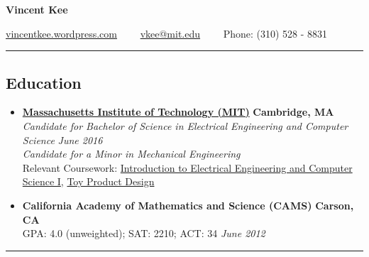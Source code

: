\documentclass[10pt,letterpaper]{article}
\begin{document}
\begin{center}
{\huge \textbf{Vincent Kee}}


\href{http://vincentkee.wordpress.com}{vincentkee.wordpress.com}\ \ \textbullet
\ \ \href{mailto:vkee@mit.edu}{vkee@mit.edu}\ \ \textbullet
\ \  Phone: (310) 528 - 8831
\end{center}

\hrule
\vspace{-0.4em}

\subsection*{Education}
  \begin{itemize}
    \parskip=-0.1em

    \item[]
    {\href{http://mit.edu/}{\textbf{Massachusetts Institute of Technology (MIT)}} \hfill
      \textbf{Cambridge, MA}}
    \\
    {\emph{Candidate for Bachelor of Science in Electrical Engineering and Computer Science} \hfill
      \emph{June 2016}}\\
      \emph{Candidate for a Minor in Mechanical Engineering}
      \\
      Relevant Coursework: \href{http://student.mit.edu/catalog/search.cgi?search=6.01&style=verbatim
}{Introduction to Electrical Engineering and Computer Science I}, \href{http://student.mit.edu/catalog/search.cgi?search=2.00b&style=verbatim}{Toy Product Design} 

    \item[]
    {{\textbf{California Academy of Mathematics and Science (CAMS)}} \hfill
      \textbf{Carson, CA}}
    \\
    {GPA: 4.0 (unweighted); SAT: 2210; ACT: 34 \hfill
      \emph{June 2012}}
  \end{itemize}

\hrule
\vspace{-0.4em}
\end{document}
